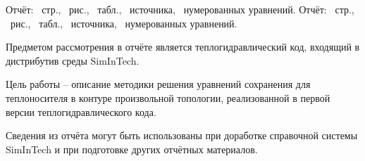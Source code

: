 
\ifxetex
Отчёт: \pageref*{sec:bibliography}~стр., \totfig~рис., \tottab~табл., \totref~источника, \totequa~нумерованных уравнений.
\else
Отчёт: \pageref*{LastPage}~стр., \totfig~рис., \tottab~табл., \totref~источника, \totequa~нумерованных уравнений.
\fi

Предметом рассмотрения в отчёте является теплогидравлический код, входящий в дистрибутив среды SimInTech.

Цель работы – описание методики решения уравнений сохранения для теплоносителя в контуре произвольной топологии, реализованной в первой версии теплогидравлического кода. 

Сведения из отчёта могут быть использованы при доработке справочной системы SimInTech и при подготовке других отчётных материалов. 